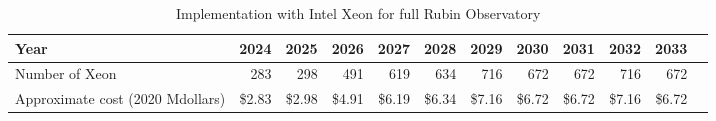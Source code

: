 \tiny \begin{longtable} { |p{}  |r  |r  |r  |r  |r  |r  |r  |r  |r  |r  |r |} 
\caption{Implementation with Intel Xeon for full Rubin Observatory \label{tab:opsXeon}}\\ 
\hline 
\textbf{Year}&\textbf{2024}&\textbf{2025}&\textbf{2026}&\textbf{2027}&\textbf{2028}&\textbf{2029}&\textbf{2030}&\textbf{2031}&\textbf{2032}&\textbf{2033} \\ \hline
{Number of Xeon}&{283}&{298}&{491}&{619}&{634}&{716}&{672}&{672}&{716}&{672} \\ \hline
{Approximate cost (2020 Mdollars)}&{\$2.83}&{\$2.98}&{\$4.91}&{\$6.19}&{\$6.34}&{\$7.16}&{\$6.72}&{\$6.72}&{\$7.16}&{\$6.72} \\ \hline
\end{longtable} \normalsize

